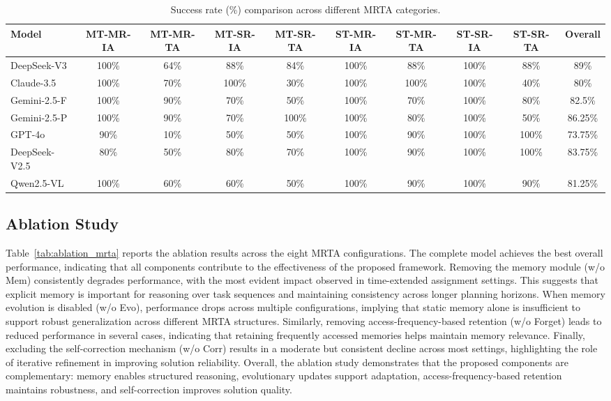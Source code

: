 \documentclass[letterpaper,journal]{IEEEtran}
\begin{document}
\begin{table}[t]
\centering
\footnotesize
\setlength{\tabcolsep}{3pt}
\caption{Success rate (\%) comparison across different MRTA categories.}
\label{tab:llm_mrta_results}
\begin{tabular}{lccccccccc}
\toprule
Model & MT-MR-IA & MT-MR-TA & MT-SR-IA & MT-SR-TA & ST-MR-IA & ST-MR-TA & ST-SR-IA & ST-SR-TA & Overall \\
\midrule
DeepSeek-V3 & 100\% & 64\% & 88\% & 84\% & 100\% & 88\% & 100\% & 88\% & 89\% \\
Claude-3.5 & 100\% & 70\% & 100\% & 30\% & 100\% & 100\% & 100\% & 40\% & 80\% \\
Gemini-2.5-F & 100\% & 90\% & 70\% & 50\% & 100\% & 70\% & 100\% & 80\% & 82.5\% \\
Gemini-2.5-P & 100\% & 90\% & 70\% & 100\% & 100\% & 80\% & 100\% & 50\% & 86.25\% \\
GPT-4o & 90\% & 10\% & 50\% & 50\% & 100\% & 90\% & 100\% & 100\% & 73.75\% \\
DeepSeek-V2.5 & 80\% & 50\% & 80\% & 70\% & 100\% & 90\% & 100\% & 100\% & 83.75\% \\
Qwen2.5-VL & 100\% & 60\% & 60\% & 50\% & 100\% & 90\% & 100\% & 90\% & 81.25\% \\
\bottomrule
\end{tabular}
\end{table}



\subsection{Ablation Study}
Table~\ref{tab:ablation_mrta} reports the ablation results across the eight MRTA configurations.
The complete model achieves the best overall performance, indicating that all components contribute to the effectiveness of the proposed framework. Removing the memory module (w/o Mem) consistently degrades performance, with the most evident impact observed in time-extended assignment settings.
This suggests that explicit memory is important for reasoning over task sequences and maintaining consistency across longer planning horizons. When memory evolution is disabled (w/o Evo), performance drops across multiple configurations, implying that static memory alone is insufficient to support robust generalization across different MRTA structures. Similarly, removing access-frequency-based retention (w/o Forget) leads to reduced performance in several cases, indicating that retaining frequently accessed memories helps maintain memory relevance. Finally, excluding the self-correction mechanism (w/o Corr) results in a moderate but consistent decline across most settings, highlighting the role of iterative refinement in improving solution reliability. Overall, the ablation study demonstrates that the proposed components are complementary: memory enables structured reasoning, evolutionary updates support adaptation, access-frequency-based retention maintains robustness, and self-correction improves solution quality.
\end{document}
